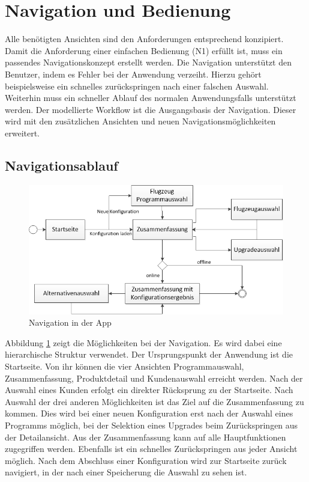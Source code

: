 \section{Navigation und Bedienung}
Alle benötigten Ansichten sind den Anforderungen entsprechend konzipiert. Damit die Anforderung einer einfachen Bedienung (N1) erfüllt ist, muss ein passendes Navigationskonzept erstellt werden. Die Navigation unterstützt den Benutzer, indem es Fehler bei der Anwendung verzeiht. Hierzu gehört beispielsweise ein schnelles zurückspringen nach einer falschen Auswahl. Weiterhin muss ein schneller Ablauf des normalen Anwendungsfalls unterstützt werden. Der modellierte Workflow ist die Ausgangsbasis der Navigation. Dieser wird mit den zusätzlichen Ansichten und neuen Navigationsmöglichkeiten erweitert. \par 

\subsection{Navigationsablauf}
\begin{figure}
\centering
\includegraphics[width=\hsize]{images/workflow_app}
\caption{Navigation in der App}
\label{appNavigation}
\end{figure}
Abbildung \ref{appNavigation} zeigt die Möglichkeiten bei der Navigation. Es wird dabei eine hierarchische Struktur verwendet. Der Ursprungspunkt der Anwendung ist die Startseite. Von ihr können die vier Ansichten Programmauswahl, Zusammenfassung, Produktdetail und Kundenauswahl erreicht werden.  Nach der Auswahl eines Kunden erfolgt ein direkter Rücksprung zu der Startseite. Nach Auswahl der drei anderen Möglichkeiten ist das Ziel auf die Zusammenfassung zu kommen. Dies wird bei einer neuen Konfiguration erst nach der Auswahl eines Programms möglich, bei der Selektion eines Upgrades beim Zurückspringen aus der Detailansicht. Aus der Zusammenfassung kann auf alle Hauptfunktionen zugegriffen werden. Ebenfalls ist ein schnelles Zurückspringen aus jeder Ansicht möglich. Nach dem Abschluss einer Konfiguration wird zur Startseite zurück navigiert, in der nach einer Speicherung die Auswahl zu sehen ist. 
 
